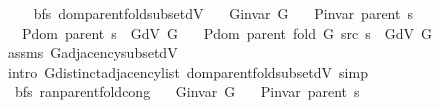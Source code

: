 \begin{isabellebody}
\ \ \isamarkupfalse%
\isanewline
{}\isamarkupfalse%
%
\endisatagproof
{\isafoldproof}%
%
\isadelimproof
\isanewline
%
\endisadelimproof
\isanewline
{}\isamarkupfalse%
\ {\isacharparenleft}{\kern0pt}\ bfs{\isacharparenright}{\kern0pt}\ dom{\isacharunderscore}{\kern0pt}parent{\isacharunderscore}{\kern0pt}fold{\isacharunderscore}{\kern0pt}subset{\isacharunderscore}{\kern0pt}dV{\isacharunderscore}{\kern0pt}{}{\isacharcolon}{\kern0pt}\isanewline
\ \ \ {\isachardoublequoteopen}G{\isachardot}{\kern0pt}invar\ G{\isachardoublequoteclose}\isanewline
\ \ \ {\isachardoublequoteopen}P{\isacharunderscore}{\kern0pt}invar\ {\isacharparenleft}{\kern0pt}parent\ s{\isacharparenright}{\kern0pt}{\isachardoublequoteclose}\isanewline
\ \ \ {\isachardoublequoteopen}P{\isachardot}{\kern0pt}dom\ {\isacharparenleft}{\kern0pt}parent\ s{\isacharparenright}{\kern0pt}\ {\isasymsubseteq}\ G{\isachardot}{\kern0pt}dV\ G{\isachardoublequoteclose}\isanewline
\ \ \ {\isachardoublequoteopen}P{\isachardot}{\kern0pt}dom\ {\isacharparenleft}{\kern0pt}parent\ {\isacharparenleft}{\kern0pt}fold\ G\ src\ s{\isacharparenright}{\kern0pt}{\isacharparenright}{\kern0pt}\ {\isasymsubseteq}\ G{\isachardot}{\kern0pt}dV\ G{\isachardoublequoteclose}\isanewline
%
\isadelimproof
\ \ %
\endisadelimproof
%
\isatagproof
{}\isamarkupfalse%
\ assms\ G{\isachardot}{\kern0pt}adjacency{\isacharunderscore}{\kern0pt}subset{\isacharunderscore}{\kern0pt}dV\isanewline
\ \ \isamarkupfalse%
\ {\isacharparenleft}{\kern0pt}intro\ G{\isachardot}{\kern0pt}distinct{\isacharunderscore}{\kern0pt}adjacency{\isacharunderscore}{\kern0pt}list\ dom{\isacharunderscore}{\kern0pt}parent{\isacharunderscore}{\kern0pt}fold{\isacharunderscore}{\kern0pt}subset{\isacharunderscore}{\kern0pt}dV{\isacharparenright}{\kern0pt}\ simp{\isacharplus}{\kern0pt}%
\endisatagproof
{\isafoldproof}%
%
\isadelimproof
\isanewline
%
\endisadelimproof
\isanewline
{}\isamarkupfalse%
\ {\isacharparenleft}{\kern0pt}\ bfs{\isacharparenright}{\kern0pt}\ ran{\isacharunderscore}{\kern0pt}parent{\isacharunderscore}{\kern0pt}fold{\isacharunderscore}{\kern0pt}cong{\isacharcolon}{\kern0pt}\isanewline
\ \ \ {\isachardoublequoteopen}G{\isachardot}{\kern0pt}invar\ G{\isachardoublequoteclose}\isanewline
\ \ \ {\isachardoublequoteopen}P{\isacharunderscore}{\kern0pt}invar\ {\isacharparenleft}{\kern0pt}parent\ s{\isacharparenright}{\kern0pt}{\isachardoublequoteclose}\isanewline

\end{isabellebody}
